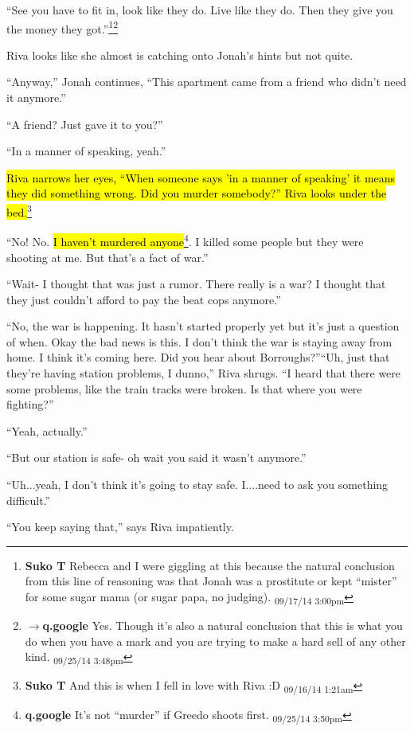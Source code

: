 ``See you have to fit in, look like they do. Live like they do.  Then they give you the money they got.''\footnote{\textbf{Suko T }Rebecca and I were giggling at this because the natural conclusion from this line of reasoning was that Jonah was a prostitute or kept ``mister'' for some sugar mama (or sugar papa, no judging). \textsubscript{09/17/14 3:00pm}}\footnote{$\rightarrow$\textbf{q.google }Yes.  Though it's also a natural conclusion that this is what you do when you have a mark and you are trying to make a hard sell of any other kind. \textsubscript{09/25/14 3:48pm}}

Riva looks like she almost is catching onto Jonah's hints but not quite.

``Anyway,'' Jonah continues, ``This apartment came from a friend who didn't need it anymore.''

``A friend?  Just gave it to you?''

``In a manner of speaking, yeah.''

\hl{Riva narrows her eyes, ``When someone says 'in a manner of speaking' it means they did something wrong.  Did you murder somebody?''  Riva looks under the bed.}\footnote{\textbf{Suko T }And this is when I fell in love with Riva :D \textsubscript{09/16/14 1:21am}}

``No!  No.  \hl{I haven't murdered anyone}\footnote{\textbf{q.google }It's not ``murder'' if Greedo shoots first. \textsubscript{09/25/14 3:50pm}}. I killed some people but they were shooting at me.  But that's a fact of war.''

``Wait- I thought that was just a rumor.  There really is a war?  I thought that they just couldn't afford to pay the beat cops anymore.''

``No, the war is happening.  It hasn't started properly yet but it's just a question of when. Okay the bad news is this.  I don't think the war is staying away from home.  I think it's coming here.  Did you hear about Borroughs?''``Uh, just that they're having station problems, I dunno,'' Riva shrugs.  ``I heard that there were some problems, like the train tracks were broken.  Is that where you were fighting?''

``Yeah, actually.''

``But our station is safe- oh wait you said it wasn't anymore.''

``Uh...yeah, I don't think it's going to stay safe.  I....need to ask you something difficult.''

``You keep saying that,'' says Riva impatiently.

